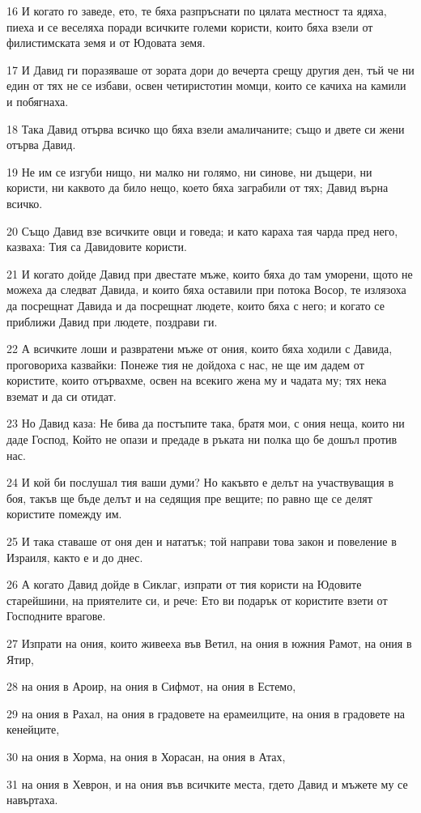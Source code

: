 \par 16 И когато го заведе, ето, те бяха разпръснати по цялата местност та ядяха, пиеха и се веселяха поради всичките големи користи, които бяха взели от филистимската земя и от Юдовата земя.
\par 17 И Давид ги поразяваше от зората дори до вечерта срещу другия ден, тъй че ни един от тях не се избави, освен четиристотин момци, които се качиха на камили и побягнаха.
\par 18 Така Давид отърва всичко що бяха взели амаличаните; също и двете си жени отърва Давид.
\par 19 Не им се изгуби нищо, ни малко ни голямо, ни синове, ни дъщери, ни користи, ни каквото да било нещо, което бяха заграбили от тях; Давид върна всичко.
\par 20 Също Давид взе всичките овци и говеда; и като караха тая чарда пред него, казваха: Тия са Давидовите користи.
\par 21 И когато дойде Давид при двестате мъже, които бяха до там уморени, щото не можеха да следват Давида, и които бяха оставили при потока Восор, те излязоха да посрещнат Давида и да посрещнат людете, които бяха с него; и когато се приближи Давид при людете, поздрави ги.
\par 22 А всичките лоши и развратени мъже от ония, които бяха ходили с Давида, проговориха казвайки: Понеже тия не дойдоха с нас, не ще им дадем от користите, които отървахме, освен на всекиго жена му и чадата му; тях нека вземат и да си отидат.
\par 23 Но Давид каза: Не бива да постъпите така, братя мои, с ония неща, които ни даде Господ, Който не опази и предаде в ръката ни полка що бе дошъл против нас.
\par 24 И кой би послушал тия ваши думи? Но какъвто е делът на участвуващия в боя, такъв ще бъде делът и на седящия пре вещите; по равно ще се делят користите помежду им.
\par 25 И така ставаше от оня ден и нататък; той направи това закон и повеление в Израиля, както е и до днес.
\par 26 А когато Давид дойде в Сиклаг, изпрати от тия користи на Юдовите старейшини, на приятелите си, и рече: Ето ви подарък от користите взети от Господните врагове.
\par 27 Изпрати на ония, които живееха във Ветил, на ония в южния Рамот, на ония в Ятир,
\par 28 на ония в Ароир, на ония в Сифмот, на ония в Естемо,
\par 29 на ония в Рахал, на ония в градовете на ерамеилците, на ония в градовете на кенейците,
\par 30 на ония в Хорма, на ония в Хорасан, на ония в Атах,
\par 31 на ония в Хеврон, и на ония във всичките места, гдето Давид и мъжете му се навъртаха.

